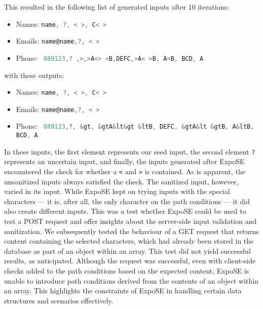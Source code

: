 This resulted in the following list of generated inputs after 10 iterations:

\begin{minipage}{1.0\textwidth}
\begin{itemize}
    \item Names: \lstinline[language=JavaScript]+name, ?, < >, C< >+
    \item Emails: \lstinline[language=JavaScript]+name@name,?, < >+
    \item Phone: \lstinline[language=JavaScript]+ 089123,? ,>,>A<> <B,DEFC,>A< >B, A<B, BCD, A+
\end{itemize}

with these outputs:
\begin{itemize}
    \item Names: \lstinline[language=JavaScript]+name, ?, < >, C< >+
    \item Emails: \lstinline[language=JavaScript]+name@name,?, < >+
    \item Phone: \lstinline[language=JavaScript]+ 089123,?, &gt, &gtA&lt&gt &ltB, DEFC, &gtA&lt &gtB, A&ltB, BCD, A+
\end{itemize}
\end{minipage}


In these inputs, the first element represents our seed input, the second element \lstinline+?+ represents an uncertain input, and finally, the inputs generated after ExpoSE encountered the check for whether a \lstinline{<} and \lstinline{>} is contained. As is apparent, the unsanitized inputs always satisfied the check. The sanitized input, however, varied in its input. While ExpoSE kept on trying inputs with the special characters — it is, after all, the only character on the path conditions — it did also create different inputs. 
This was a test whether ExpoSE could be used to test a \textsc{POST} request and offer insights about the server-side input validation and sanitization. 
We subsequently tested the behaviour of a \textsc{GET} request that returns content containing the selected characters, which had already been stored in the database as part of an object within an array. This test did not yield successful results, as anticipated. Although the request was successful, even with client-side checks added to the path conditions based on the expected content, ExpoSE is unable to introduce path conditions derived from the contents of an object within an array. This highlights the constraints of ExpoSE in handling certain data structures and scenarios effectively.








